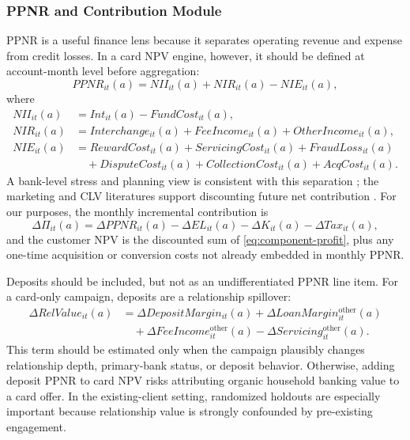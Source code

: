 \documentclass[11pt]{article}
\newcommand{\1}{\mathbf{1}}
\begin{document}
\subsubsection{PPNR and Contribution Module}
\label{subsec:ppnr-module}

PPNR is a useful finance lens because it separates operating revenue and
expense from credit losses. In a card NPV engine, however, it should be defined
at account-month level before aggregation:
\begin{equation}
  PPNR_{it}(a)
  =
  NII_{it}(a)
  + NIR_{it}(a)
  - NIE_{it}(a),
  \label{eq:ppnr}
\end{equation}
where
\begin{align}
  NII_{it}(a)
    &= Int_{it}(a)-FundCost_{it}(a), \label{eq:nii}\\
  NIR_{it}(a)
    &= Interchange_{it}(a)+FeeIncome_{it}(a)+OtherIncome_{it}(a),
       \label{eq:nir}\\
  NIE_{it}(a)
    &= RewardCost_{it}(a)+ServicingCost_{it}(a)+FraudLoss_{it}(a)
       \nonumber\\
    &\quad
       +DisputeCost_{it}(a)+CollectionCost_{it}(a)+AcqCost_{it}(a).
       \label{eq:nie}
\end{align}
A bank-level stress and planning view is consistent with this separation
\citep{federalreserve2025stressmethodology,federalreserve2026stressmethodology};
the marketing and CLV literatures support discounting future net contribution
\citep{berger1998clv,rust2004return,venkatesan2004clv}.
For our purposes, the monthly incremental contribution is
\begin{equation}
  \Delta \Pi_{it}(a)
  =
  \Delta PPNR_{it}(a)
  - \Delta EL_{it}(a)
  - \Delta K_{it}(a)
  - \Delta Tax_{it}(a),
  \label{eq:component-profit}
\end{equation}
and the customer NPV is the discounted sum of
\eqref{eq:component-profit}, plus any one-time acquisition or conversion costs
not already embedded in monthly PPNR.

Deposits should be included, but not as an undifferentiated PPNR line item. For
a card-only campaign, deposits are a relationship spillover:
\begin{align}
  \Delta RelValue_{it}(a)
  &=
  \Delta DepositMargin_{it}(a)
  + \Delta LoanMargin^{\mathrm{other}}_{it}(a)
  \nonumber\\
  &\quad
  + \Delta FeeIncome^{\mathrm{other}}_{it}(a)
  - \Delta Servicing^{\mathrm{other}}_{it}(a).
  \label{eq:relationship-value}
\end{align}
This term should be estimated only when the campaign plausibly changes
relationship depth, primary-bank status, or deposit behavior. Otherwise, adding
deposit PPNR to card NPV risks attributing organic household banking value to a
card offer. In the existing-client setting, randomized holdouts are especially
important because relationship value is strongly confounded by pre-existing
engagement.
\end{document}
